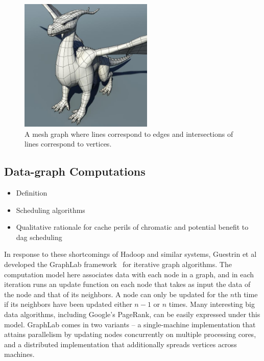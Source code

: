 \begin{figure}[h]
\centering
\includegraphics[width=2.5in]{dragon}
\caption{A mesh graph where lines correspond to edges and intersections of lines correspond to vertices.}
\label{fig:mesh}
\end{figure}




\subsection{Data-graph Computations}
		\begin{itemize}
		\item Definition
		\item Scheduling algorithms
		\item Qualitative rationale for cache perils of chromatic and potential benefit to dag scheduling
		\end{itemize}

In response to these shortcomings of Hadoop and similar systems, 
Guestrin et al developed the GraphLab 
framework~\cite{LowBiGo12} for iterative graph algorithms. 
The computation model here associates data with each node in a 
graph, and in each iteration runs an update function on each 
node that takes as input the data of the node and that of its 
neighbors. A node can only be updated for the $n$th time if 
its neighbors have been updated either $n-1$ or $n$ times. 
Many interesting big data algorithms, including Google's 
PageRank, can be easily expressed under this model. GraphLab 
comes in two variants -- a single-machine implementation that 
attains parallelism by updating nodes concurrently on multiple 
processing cores, and a distributed implementation that 
additionally spreads vertices across machines.



